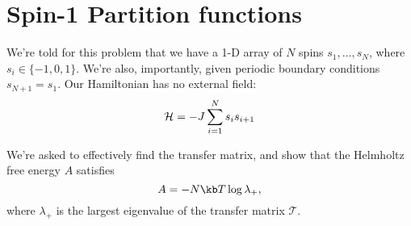 \documentclass[../../PS3.tex]{subfiles}
\newcommand{\trm}{\mathcal{T}}
\begin{document}
\section{Spin-1 Partition functions}

We're told for this problem that we have a 1-D array of $N$ spins $s_1,\dotsc, s_N$, where $s_i \in \{-1, 0, 1\}$. We're also, importantly, given periodic boundary conditions $s_{N+1} = s_1$.
Our Hamiltonian has no external field:
\begin{equation}
	\mathcal{H} = - J \sum_{i=1}^{N} s_i s_{i+1}
\end{equation}

We're asked to effectively find the transfer matrix, and show that the Helmholtz free energy $A$ satisfies
\begin{equation}
	A = -N\kb T \log{\lambda_{+}},
\end{equation}
where $\lambda_{+}$ is the largest eigenvalue of the transfer matrix $\trm$.
\end{document}
